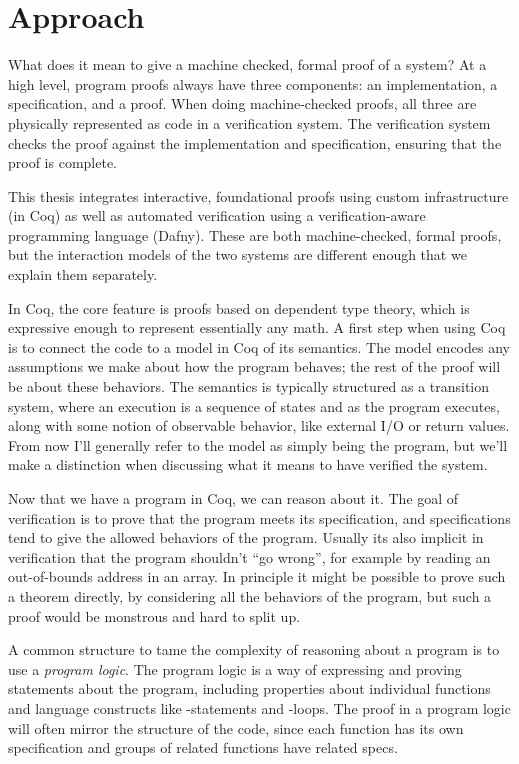 \section{Approach}

What does it mean to give a machine checked, formal proof of a system? At a high
level, program proofs always have three components: an implementation, a
specification, and a proof. When doing machine-checked proofs, all three are
physically represented as code in a verification system. The verification system
checks the proof against the implementation and specification, ensuring that the
proof is complete.

This thesis integrates interactive, foundational proofs using custom
infrastructure (in Coq) as well as automated verification using a
verification-aware programming language (Dafny). These are both machine-checked,
formal proofs, but the interaction models of the two systems are different
enough that we explain them separately.

In Coq, the core feature is proofs based on dependent type theory, which is
expressive enough to represent essentially any math. A first step when using Coq
is to connect the code to a model in Coq of its semantics. The model encodes any
assumptions we make about how the program behaves; the rest of the proof will be
about these behaviors. The semantics is typically structured as a transition
system, where an execution is a sequence of states and as the program executes,
along with some notion of observable behavior, like external I/O or return
values. From now I'll generally refer to the model as simply being the program,
but we'll make a distinction when discussing what it means to have verified
the system.

Now that we have a program in Coq, we can reason about it. The goal of
verification is to prove that the program meets its specification, and
specifications tend to give the allowed behaviors of the program. Usually its
also implicit in verification that the program shouldn't ``go wrong'', for
example by reading an out-of-bounds address in an array. In principle it might
be possible to prove such a theorem directly, by considering all the behaviors
of the program, but such a proof would be monstrous and hard to split up.

A common structure to tame the complexity of reasoning about a program is to use
a \emph{program logic}. The program logic is a way of expressing and proving
statements about the program, including properties about individual functions
and language constructs like -statements and -loops. The proof
in a program logic will often mirror the structure of the code, since each
function has its own specification and groups of related functions have related
specs.

